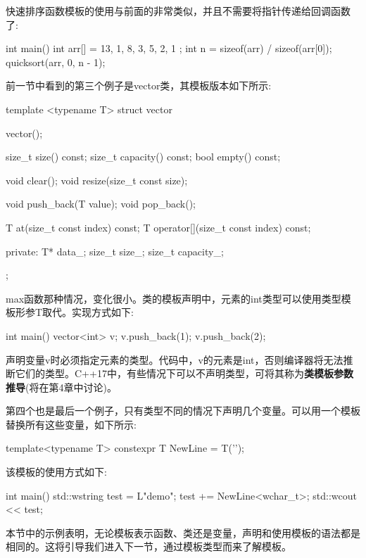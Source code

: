 快速排序函数模板的使用与前面的非常类似，并且不需要将指针传递给回调函数了:

\begin{cpp}
int main()
{
	int arr[] = { 13, 1, 8, 3, 5, 2, 1 };
	int n = sizeof(arr) / sizeof(arr[0]);
	quicksort(arr, 0, n - 1);
}
\end{cpp}

前一节中看到的第三个例子是vector类，其模板版本如下所示:

\begin{cpp}
template <typename T>
struct vector
{
	vector();
	
	size_t size() const;
	size_t capacity() const;
	bool empty() const;
	
	void clear();
	void resize(size_t const size);
	
	void push_back(T value);
	void pop_back();
	
	T at(size_t const index) const;
	T operator[](size_t const index) const;
	
private:
	T* data_;
	size_t size_;
	size_t capacity_;
};
\end{cpp}

max函数那种情况，变化很小。类的模板声明中，元素的int类型可以使用类型模板形参T取代。实现方式如下:

\begin{cpp}
int main()
{
	vector<int> v;
	v.push_back(1);
	v.push_back(2);
}
\end{cpp}

声明变量v时必须指定元素的类型。代码中，v的元素是int，否则编译器将无法推断它们的类型。C++17中，有些情况下可以不声明类型，可将其称为\textbf{类模板参数推导}(将在第4章中讨论)。

第四个也是最后一个例子，只有类型不同的情况下声明几个变量。可以用一个模板替换所有这些变量，如下所示:

\begin{cpp}
template<typename T>
constexpr T NewLine = T('\n');
\end{cpp}

该模板的使用方式如下:

\begin{cpp}
int main()
{
	std::wstring test = L"demo";
	test += NewLine<wchar_t>;
	std::wcout << test;
}
\end{cpp}

本节中的示例表明，无论模板表示函数、类还是变量，声明和使用模板的语法都是相同的。这将引导我们进入下一节，通过模板类型而来了解模板。














